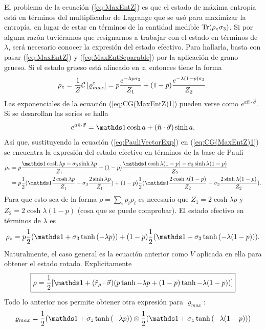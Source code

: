El problema de la ecuación (\ref{eq:MaxEntZ}) es que el estado de máxima entropía está en términos del multiplicador de Lagrange que se usó para maximizar la entropía, en lugar de estar en términos de la cantidad medible $\Tr(\rho_{z}\sigma_{3})$. Si por alguna razón tuviéramos que resignarnos a trabajar con el estado en términos de $\lambda$, será necesario conocer la expresión del estado efectivo. Para hallarla, basta con pasar (\ref{eq:MaxEntZ}) y (\ref{eq:MaxEntSeparable}) por la aplicación de grano grueso. Si el estado grueso está alineado en $z$, entonces tiene la forma
\begin{equation}\label{eq:CG(MaxEntZ)1}
    \rho_{z}=\frac{1}{Z}\mathcal{C}\left[\varrho_{max}^{z}\right]=p\frac{e^{-\lambda p\sigma_{3}}}{Z_{1}}+(1-p)\frac{e^{-\lambda(1-p)\sigma_{3}}}{Z_{2}}.
\end{equation}
Las exponenciales de la ecuación (\ref{eq:CG(MaxEntZ)1}) pueden verse como $e^{a\hat{n}\cdot \vec{\sigma}}$. Si se desarollan las series se halla
\begin{equation}\label{eq:PauliVectorExp}
    e^{a\hat{n}\cdot \vec{\sigma}}=\Id \cosh{a}+(\hat{n}\cdot \vec{\sigma})\sinh{a}.
\end{equation}
Así que, sustituyendo la ecuación (\ref{eq:PauliVectorExp}) en (\ref{eq:CG(MaxEntZ)1}) se encuentra la expresión del estado efectivo en términos de la base de Pauli
\begin{align*}
    \rho_{z}&=p\frac{\Id \cosh{\lambda p}-\sigma_{3}\sinh{\lambda p}}{Z_{1}}+(1-p)\frac{\Id \cosh{\lambda (1-p)}-\sigma_{3}\sinh{\lambda (1-p)}}{Z_{2}}\\
    &=p\frac{1}{2}(\Id \frac{2\cosh{\lambda p}}{Z_{1}}-\sigma_{3}\frac{2\sinh{\lambda p}}{Z_{1}})+(1-p)\frac{1}{2}(\Id \frac{2\cosh{\lambda (1-p)}}{Z_{2}}-\sigma_{3}\frac{2\sinh{\lambda (1-p)}}{Z_{2}}).
\end{align*}
Para que esto sea de la forma $\rho=\sum_{i}p_{i}\rho_{i}$ es necesario que $Z_{1}=2\cosh{\lambda p}$ y $Z_{2}=2\cosh{\lambda (1-p)}$ (cosa que se puede comprobar). El estado efectivo en términos de $\lambda $ es
\begin{equation}\label{eq:CG(MaxEntZ)2}
    \rho_{z}=p\frac{1}{2}(\Id+\sigma_{3}\tanh{(-\lambda p)})+(1-p)\frac{1}{2}(\Id+\sigma_{3}\tanh{(-\lambda (1-p))}).
\end{equation}
Naturalmente, el caso general es la ecuación anterior como $V$ aplicada en ella para obtener el estado rotado. Explicitamente
\begin{equation}\label{eq:CG(MaxEnt)}
  \boxed{\rho=\frac{1}{2}[\Id+(\hat{r}_{\rho}\cdot\vec{\sigma})(p\tanh{-\lambda p}+(1-p)\tanh{-\lambda (1-p)})]}
\end{equation}
Todo lo anterior nos permite obtener otra expresión para $\varrho_{max}$:
\begin{equation*}
  \varrho_{max}=\frac{1}{2}(\Id+\sigma_{z}\tanh{(-\lambda p)})\otimes\frac{1}{2}(\Id+\sigma_{z}\tanh{(-\lambda (1-p))})
\end{equation*}
